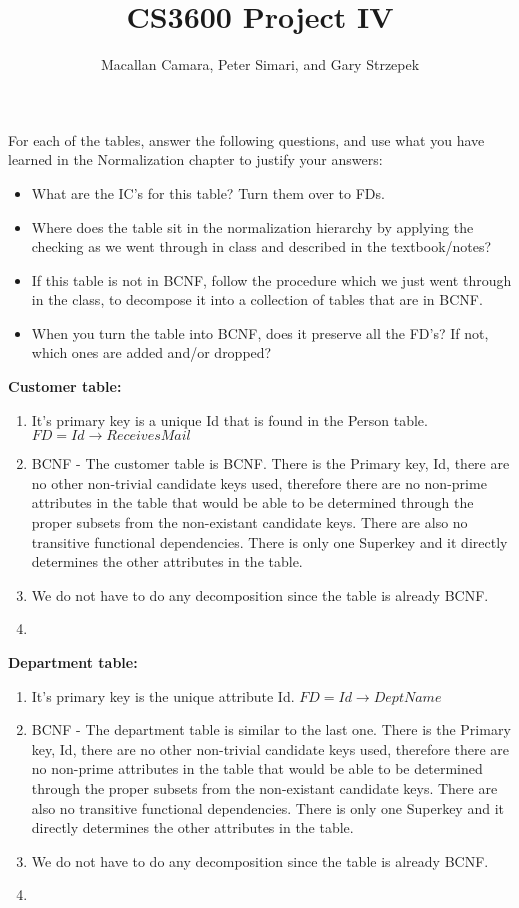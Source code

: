 \documentclass{article}
\title{CS3600 Project IV}
\author{Macallan Camara, Peter Simari, and Gary Strzepek}
\begin{document}
  \maketitle
  \par For each of the tables, answer the following questions, and use what you
  have learned in the Normalization chapter to justify your answers:
  \begin{itemize}
  	\item What are the IC's for this table? Turn them over to FDs.
  	\item Where does the table sit in the normalization hierarchy by applying the
  	checking as we went through in class and described in the textbook/notes?
  	\item If this table is not in BCNF, follow the procedure which we just went
  	through in the class, to decompose it into a collection of tables that are in
  	BCNF.
  	\item When you turn the table into BCNF, does it preserve all the FD's? If
  	not, which ones are added and/or dropped?
  \end{itemize}
  \par\textbf{Customer table:}
  \begin{enumerate}[label=\roman*]
  	\item It's primary key is a unique Id that is found in the Person table. \newline
    $FD = Id \rightarrow ReceivesMail$
  	\item BCNF - The customer table is BCNF. There is the Primary key, Id, there are no other non-trivial candidate keys used, therefore there are no non-prime attributes in the table that would be able to be determined through the proper subsets from the non-existant candidate keys. There are also no transitive functional dependencies. There is only one Superkey and it directly determines the other attributes in the table.
  	\item We do not have to do any decomposition since the table is already BCNF.
  	\item
  \end{enumerate}
  \par\textbf{Department table:}
  \begin{enumerate}[label=\roman*]
  	\item It's primary key is the unique attribute Id. \newline
    $FD = Id \rightarrow DeptName$
  	\item BCNF - The department table is similar to the last one. There is the Primary key, Id, there are no other non-trivial candidate keys used, therefore there are no non-prime attributes in the table that would be able to be determined through the proper subsets from the non-existant candidate keys. There are also no transitive functional dependencies. There is only one Superkey and it directly determines the other attributes in the table.
  	\item We do not have to do any decomposition since the table is already BCNF.
  	\item
  \end{enumerate}
\end{document}
